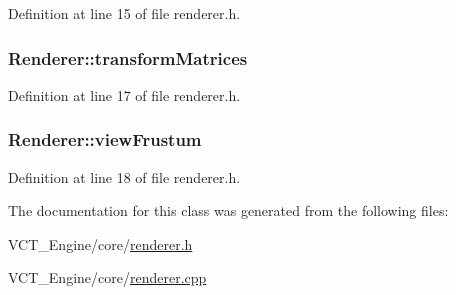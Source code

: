Definition at line 15 of file renderer.\+h.

\hypertarget{class_renderer_ad4ce90a115478964bef92667f131870f}{}
\subsubsection[{transform\+Matrices}]{ Renderer\+::transform\+Matrices}\label{class_renderer_ad4ce90a115478964bef92667f131870f}


Definition at line 17 of file renderer.\+h.

\hypertarget{class_renderer_a5f730b80cb0e6894bc7205b7eef91999}{}
\subsubsection[{view\+Frustum}]{ Renderer\+::view\+Frustum}\label{class_renderer_a5f730b80cb0e6894bc7205b7eef91999}


Definition at line 18 of file renderer.\+h.



The documentation for this class was generated from the following files\+:\begin{DoxyCompactItemize}
\item 
V\+C\+T\+\_\+\+Engine/core/\hyperlink{renderer_8h}{renderer.\+h}\item 
V\+C\+T\+\_\+\+Engine/core/\hyperlink{renderer_8cpp}{renderer.\+cpp}\end{DoxyCompactItemize}
